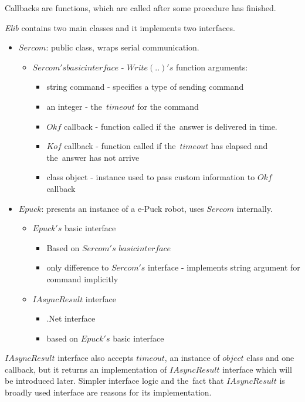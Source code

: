   \begin{remark}[Callbacks]
  Callbacks are functions, which are called after some procedure has finished.
  \end{remark}
  {\it Elib} contains two main classes and it implements two interfaces.
  \begin{itemize}
    \item $Sercom$: public class, wraps serial communication.
    \begin{itemize}
      \item $Sercom's basic interface$ - $Write(..)'s$ function arguments:
      \begin{itemize}
        \item string command - specifies a type of sending command
        \item an integer - the~$timeout$ for the command
        \item $Okf$ callback - function called if the~answer is delivered in time.
        \item $Kof$ callback - function called if the~$timeout$ has elapsed and the~answer has not arrive
        \item class object - instance used to pass custom information to $Okf$ callback
      \end{itemize}
    \end{itemize}
    \item $Epuck$: presents an instance of a e-Puck robot, uses $Sercom$ internally.
    \begin{itemize}
      \item $Epuck's$ basic interface 
      \begin{itemize}
        \item Based on $Sercom's$ $basic interface$
        \item only difference to $Sercom's$ interface - implements string argument for command implicitly
      \end{itemize}
      \item $IAsyncResult$ interface
      \begin{itemize}
        \item .Net interface
        \item based on $Epuck's$ basic interface
      \end{itemize}
    \end{itemize}
  \end{itemize}

  $IAsyncResult$ interface also accepts $timeout$, an instance of $object$ class and one callback, but it returns 
  an implementation of $IAsyncResult$ interface which will be introduced later.
  Simpler interface logic and the~fact that $IAsyncResult$ is broadly used interface
  are reasons for its implementation.

